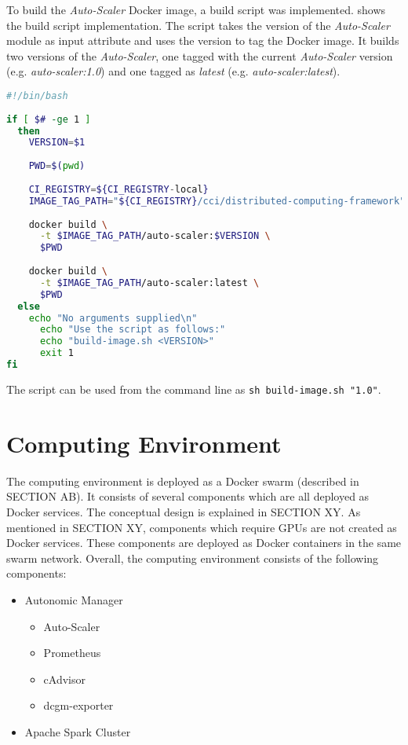 To build the \textit{Auto-Scaler} Docker image, a build script was implemented.  shows the build script implementation.
The script takes the version of the \textit{Auto-Scaler} module as input attribute and uses the version to tag the Docker image.
It builds two versions of the \textit{Auto-Scaler}, one tagged with the current \textit{Auto-Scaler} version (e.g. \textit{auto-scaler:1.0}) and one tagged as \textit{latest} (e.g. \textit{auto-scaler:latest}).
\begin{lstlisting}[label=lst:06_auto-scaler_build, caption=Auto-Scaler build script, language=sh]
#!/bin/bash
 
if [ $# -ge 1 ]
  then
    VERSION=$1
 
    PWD=$(pwd)
 
    CI_REGISTRY=${CI_REGISTRY-local}
    IMAGE_TAG_PATH="${CI_REGISTRY}/cci/distributed-computing-framework"
 
    docker build \
      -t $IMAGE_TAG_PATH/auto-scaler:$VERSION \
      $PWD
 
    docker build \
      -t $IMAGE_TAG_PATH/auto-scaler:latest \
      $PWD
  else
    echo "No arguments supplied\n"
      echo "Use the script as follows:"
      echo "build-image.sh <VERSION>"
      exit 1
fi
\end{lstlisting}
The script can be used from the command line as \texttt{sh build-image.sh "1.0"}.

\section{Computing Environment}
The computing environment is deployed as a Docker swarm (described in SECTION AB). It consists of several components which are all deployed as Docker services. The conceptual design is explained in SECTION XY.
As mentioned in SECTION XY, components which require GPUs are not created as Docker services. These components are deployed as Docker containers in the same swarm network.
Overall, the computing environment consists of the following components:
\begin{itemize}
\item Autonomic Manager
\begin{itemize}
\item Auto-Scaler
\item Prometheus
\item cAdvisor
\item dcgm-exporter
\end{itemize}

\item Apache Spark Cluster
\end{itemize}


